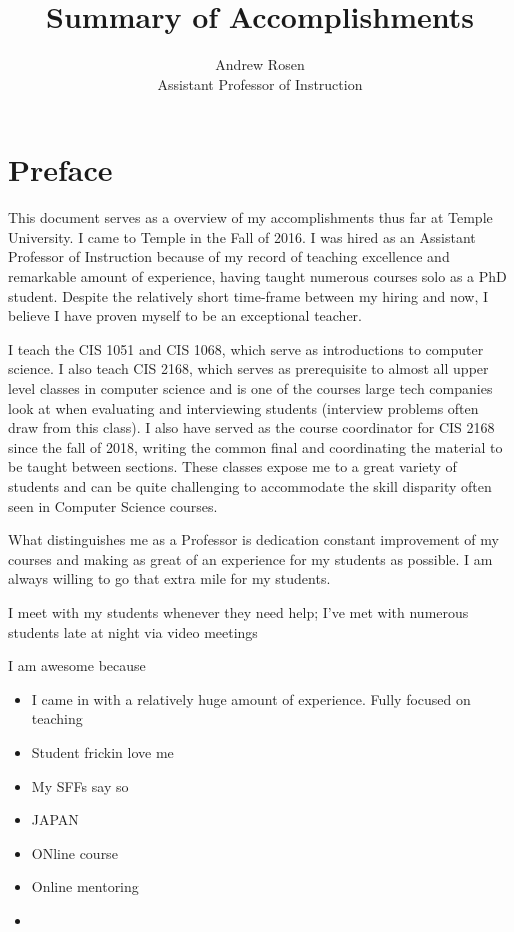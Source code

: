 \documentclass[]{article}
\title{Summary of Accomplishments}
\author{Andrew Rosen\\Assistant Professor of Instruction}
\begin{document}
\maketitle


\section{Preface}
This document serves as a overview of my accomplishments thus far at Temple University.  
I came to Temple in the Fall of 2016.
I was hired as an Assistant Professor of Instruction because of my record of teaching excellence and remarkable amount of experience, having taught numerous courses solo as a PhD student.
Despite the relatively short time-frame between my hiring and now, I believe I have proven myself to be an exceptional teacher.

I teach the CIS 1051 and CIS 1068, which serve as introductions to computer science.
I also teach CIS 2168,  which serves as prerequisite to almost all upper level classes in computer science and is one of the courses large tech companies look at when evaluating and interviewing students (interview problems often draw from this class).  
I also have served as the course coordinator for CIS 2168 since the fall of 2018, writing the common final and coordinating the material to be taught between sections.
These classes expose me to a great variety of students and can be quite challenging to accommodate the skill disparity often seen in Computer Science courses.


What distinguishes me as a Professor is dedication constant improvement of my courses and making as great of an experience for my students as possible.
I am always willing to go that extra mile for my students.





I meet with my students whenever they need help; I've met with numerous students late at night via video meetings


I am awesome because
\begin{itemize}
	\item I came in with a relatively huge amount of experience.  Fully focused on teaching
	\item Student frickin love me
	\item My SFFs say so
	\item JAPAN
	\item ONline course
	\item Online mentoring
	\item 
\end{itemize}
\end{document}
